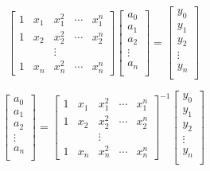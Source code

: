 \documentclass[11pt,titlepage,fleqn]{article}
\begin{document}
\begin{equation}
\begin{bmatrix}
1 & x_1 &  x_1^2  & \cdots & x_1^n\\
1 & x_2 & x_2^2 & \cdots & x_2^n\\
& & \vdots& &  \\
1 & x_n & x_n^2 & \cdots & x_n^n
\end{bmatrix}
\begin{bmatrix}
a_0 \\
a_1 \\
a_2 \\
\vdots\\
a_n\\
\end{bmatrix} = 
\begin{bmatrix}
y_0 \\
y_1 \\
y_2 \\
\vdots\\
y_n\\
\end{bmatrix}
\end{equation}

\begin{equation}
\begin{bmatrix}
a_0 \\
a_1 \\
a_2 \\
\vdots\\
a_n\\
\end{bmatrix} = 
\begin{bmatrix}
1 & x_1 &  x_1^2  & \cdots & x_1^n\\
1 & x_2 & x_2^2 & \cdots & x_2^n\\
& & \vdots& &  \\
1 & x_n & x_n^2 & \cdots & x_n^n
\end{bmatrix}^{-1}
\begin{bmatrix}
y_0 \\
y_1 \\
y_2 \\
\vdots\\
y_n\\
\end{bmatrix}
\end{equation}
\end{document}
